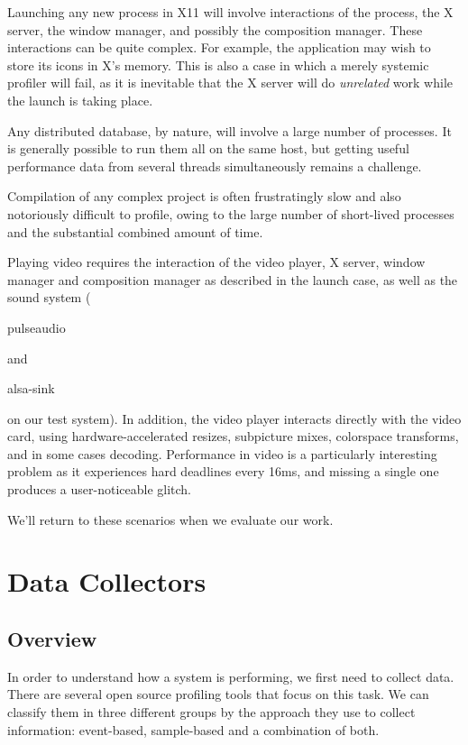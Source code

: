 \documentclass[10pt]{article}
\begin{document}
Launching any new process in X11 will involve interactions of the process, the
X server, the window manager, and possibly the composition manager. These
interactions can be quite complex. For example, the application may wish to
store its icons in X's memory. This is also a case in which a merely systemic
profiler will fail, as it is inevitable that the X server will do
\emph{unrelated} work while the launch is taking place.

Any distributed database, by nature, will involve a large number of processes.
It is generally possible to run them all on the same host, but getting useful
performance data from several threads simultaneously remains a challenge.

Compilation of any complex project is often frustratingly slow and also
notoriously difficult to profile, owing to the large number of short-lived
processes and the substantial combined amount of time.

Playing video requires the interaction of the video player, X server, window
manager and composition manager as described in the launch case, as well as the
sound system (\begin{tt}pulseaudio\end{tt} and \begin{tt}alsa-sink\end{tt} on
our test system). In addition, the video player interacts directly with the
video card, using hardware-accelerated resizes, subpicture mixes, colorspace
transforms, and in some cases decoding. Performance in video is a
particularly interesting problem as it experiences hard deadlines every 16ms,
and missing a single one produces a user-noticeable glitch.

We'll return to these scenarios when we evaluate our work.

\section{Data Collectors}

\subsection{Overview}

In order to understand how a system is performing, we first need to collect
data. There are several open source profiling tools that focus on this task. We
can classify them in three different groups by the approach they use to collect
information: event-based, sample-based and a combination of both.
\end{document}
